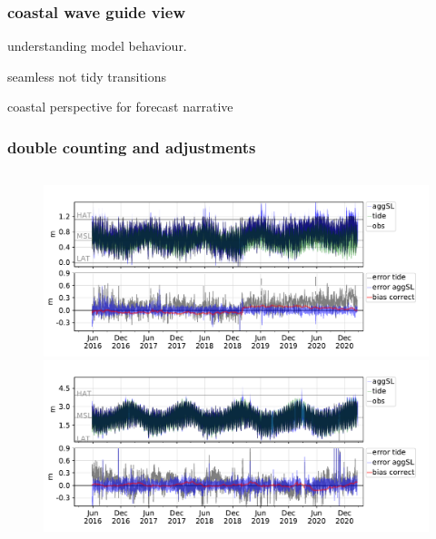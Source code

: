 \begin{frame}
\frametitle{coastal wave guide view}
understanding model behaviour.
\vfill{}

seamless not tidy transitions
\vfill{}

coastal perspective for forecast narrative 

\end{frame}
\begin{frame}
\frametitle{double counting and adjustments}
\begin{columns}
    \begin{column}{0.5\textwidth}
      \begin{figure}      
        \includegraphics[width=\textwidth]{figures/plots/008314_verify_ts.pdf}
        \includegraphics[width=\textwidth]{figures/plots/529020_verify_ts.pdf}
      \end{figure}
    \end{column}


\end{columns}
\end{frame}
